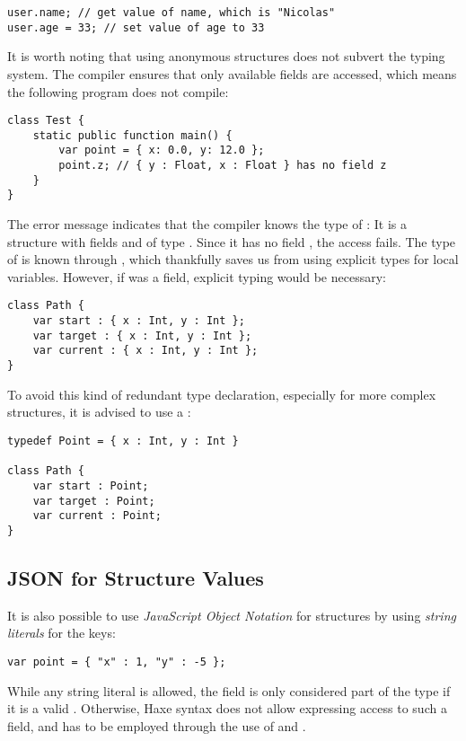 \begin{lstlisting}
user.name; // get value of name, which is "Nicolas"
user.age = 33; // set value of age to 33
\end{lstlisting}
It is worth noting that using anonymous structures does not subvert the typing system. The compiler ensures that only available fields are accessed, which means the following program does not compile:

\begin{lstlisting}
class Test {
	static public function main() {
		var point = { x: 0.0, y: 12.0 };
		point.z; // { y : Float, x : Float } has no field z
	}
}
\end{lstlisting}
The error message indicates that the compiler knows the type of : It is a structure with fields  and  of type . Since it has no field , the access fails.
The type of  is known through , which thankfully saves us from using explicit types for local variables. However, if  was a field, explicit typing would be necessary:

\begin{lstlisting}
class Path {
    var start : { x : Int, y : Int };
    var target : { x : Int, y : Int };
    var current : { x : Int, y : Int };
}
\end{lstlisting}
To avoid this kind of redundant type declaration, especially for more complex structures, it is advised to use a :

\begin{lstlisting}
typedef Point = { x : Int, y : Int }

class Path {
    var start : Point;
    var target : Point;
    var current : Point;
}
\end{lstlisting}


\subsection{JSON for Structure Values}
\label{types-structure-json}

It is also possible to use \emph{JavaScript Object Notation} for structures by using \emph{string literals} for the keys:

\begin{lstlisting}
var point = { "x" : 1, "y" : -5 };
\end{lstlisting}
While any string literal is allowed, the field is only considered part of the type if it is a valid . Otherwise, Haxe syntax does not allow expressing access to such a field, and  has to be employed through the use of  and .

